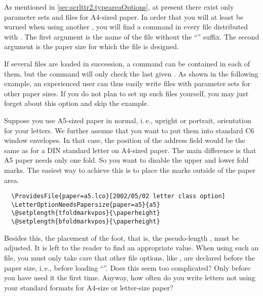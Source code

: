 \begin{Explain}
\begin{Declaration}
\end{Declaration}
As mentioned in \autoref{sec:scrlttr2.typeareaOptions}, at present
there exist only parameter sets and  files for A4-sized
paper. In order that you will at least be warned when using another
, you will find a 
command in every  file distributed with {\KOMAScript}. The
first argument is the name of the  file without the
``'' suffix. The second argument is the paper size for
which the  file is designed.

If several  files are loaded in succession, a
 command can be contained in each of
them, but the  command will only check the last given
. As shown in the following example, an experienced
user can thus easily write  files with parameter sets for
other paper sizes. If you do not plan to set up such  files
yourself, you may just forget about this option and skip the example.

\begin{Example}
  Suppose you use A5-sized paper in normal, i.\,e., upright or
  portrait, orientation for your letters. We further assume that you
  want to put them into standard C6 window envelopes. In that case,
  the position of the address field would be the same as for a DIN
  standard letter on A4-sized paper. The main difference is that A5
  paper needs only one fold. So you want to disable the upper and
  lower fold marks. The easiest way to achieve this is to place the
  marks outside of the paper area.
\begin{lstlisting}
  \ProvidesFile{paper=a5.lco}[2002/05/02 letter class option]
  \LetterOptionNeedsPapersize{paper=a5}{a5}
  \@setplength{tfoldmarkvpos}{\paperheight}
  \@setplength{bfoldmarkvpos}{\paperheight}
\end{lstlisting}
Besides this, the placement of the foot, that is, the pseudo-length
, must be adjusted. It is left to the reader to
find an appropriate value. When using such an  file, you
must only take care that other  file options, like
, are declared before the paper size, i.\,e., before loading
``''. Does this seem too complicated?  Only before
you have used it the first time. Anyway, how often do you write
letters not using your standard formats for A4-size or letter-size
paper?
\end{Example}
%
\end{Explain}


